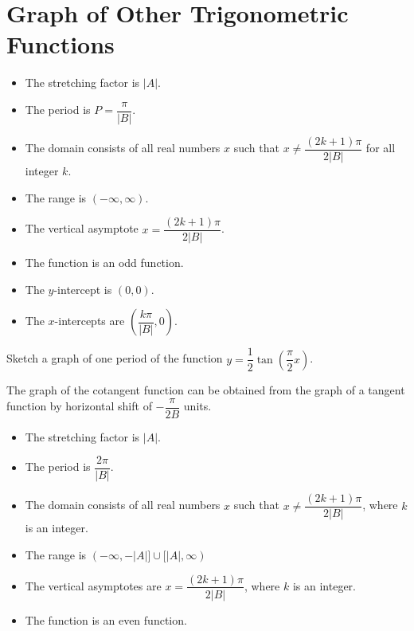\newpage

\section{Graph of Other Trigonometric Functions}

\begin{howto}[Graph of $y = A \tan(Bx)$]
  \begin{itemize}
    \item The stretching factor is $|A|$.
    \item The period is $P=\dfrac{\pi}{|B|}$.
    \item The domain consists of all real numbers $x$ such that $x\ne \dfrac{(2k+1)\pi}{2|B|}$ for all integer $k$.
    \item The range is $(-\infty,\infty)$.
    \item The vertical asymptote $x=\dfrac{(2k+1)\pi}{2|B|}$.
    \item The function is an odd function.
    \item The $y$-intercept is $(0, 0)$.
    \item The $x$-intercepts are $\left(\dfrac{k\pi}{|B|},0\right)$.
  \end{itemize}
\end{howto}

\begin{example}
  Sketch a graph of one period of the function  $y=\dfrac{1}{2}\tan\left(\dfrac{\pi}{2}x\right)$.
\end{example}

\begin{note}
The graph of the cotangent function can be obtained from the graph of a tangent function by horizontal shift of $-\dfrac{\pi}{2B}$ units.
\end{note}



\newpage

\begin{howto}[Graph of $y = A \sec(Bx)$]
\begin{itemize}
  \item The stretching factor is $|A|$.
  \item The period is $\dfrac{2\pi}{|B|}$.
  \item The domain consists of all real numbers $x$ such that $x\ne \dfrac{(2k+1)\pi}{2|B|}$, where $k$ is an integer.
  \item The range is $(-\infty,- |A| ]\cup [ |A|,\infty)$
  \item The vertical asymptotes are $x=\dfrac{(2k+1)\pi}{2|B|}$, where $k$ is an integer.
  \item The function is an even function.
\end{itemize}
\end{howto}

